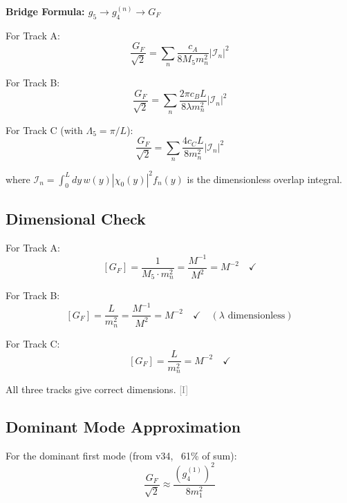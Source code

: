 \documentclass[11pt,a4paper]{article}
\newcommand{\tagI}{\textcolor{gray}{[I]}}
\begin{document}
\begin{bridgebox}
\textbf{Bridge Formula: $g_5 \to g_4^{(n)} \to G_F$}

For Track A:
\begin{equation}
\label{eq:bridge-a}
\frac{G_F}{\sqrt{2}} = \sum_n \frac{c_A}{8 M_5 m_n^2} \left|\mathcal{I}_n\right|^2
\end{equation}

For Track B:
\begin{equation}
\label{eq:bridge-b}
\frac{G_F}{\sqrt{2}} = \sum_n \frac{2\pi c_B L}{8\lambda m_n^2} \left|\mathcal{I}_n\right|^2
\end{equation}

For Track C (with $\Lambda_5 = \pi/L$):
\begin{equation}
\label{eq:bridge-c}
\frac{G_F}{\sqrt{2}} = \sum_n \frac{4c_C L}{8 m_n^2} \left|\mathcal{I}_n\right|^2
\end{equation}

where $\mathcal{I}_n = \int_0^L dy\, w(y) |\chi_0(y)|^2 f_n(y)$ is the dimensionless
overlap integral.
\end{bridgebox}

\subsection{Dimensional Check}

For Track A:
\begin{equation}
\label{eq:dim-check-a}
[G_F] = \frac{1}{M_5 \cdot m_n^2} = \frac{M^{-1}}{M^2} = M^{-2} \quad \checkmark
\end{equation}

For Track B:
\begin{equation}
\label{eq:dim-check-b}
[G_F] = \frac{L}{m_n^2} = \frac{M^{-1}}{M^2} = M^{-2} \quad \checkmark \quad (\lambda \text{ dimensionless})
\end{equation}

For Track C:
\begin{equation}
\label{eq:dim-check-c}
[G_F] = \frac{L}{m_n^2} = M^{-2} \quad \checkmark
\end{equation}

All three tracks give correct dimensions. \tagI

\subsection{Dominant Mode Approximation}

For the dominant first mode (from v34, ~61\% of sum):
\begin{equation}
\label{eq:dominant-mode}
\frac{G_F}{\sqrt{2}} \approx \frac{(g_4^{(1)})^2}{8 m_1^2}
\end{equation}
\end{document}
